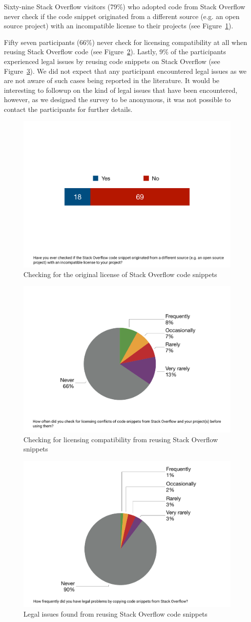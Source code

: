 \documentclass{svjour3}                     %
\begin{document}
Sixty-nine Stack Overflow visitors (79\%) who adopted code from Stack Overflow
never check if the code snippet originated from a different source (e.g. an open
source project) with an incompatible license to their projects (see
Figure~\ref{fig:survey_visitor_original_license}).

Fifty seven participants (66\%) never check for licensing compatibility at all
when reusing Stack Overflow code (see
Figure~\ref{fig:survey_visitor_licensing_conflict_check}). Lastly, 9\% of
the participants experienced legal issues by reusing code snippets on Stack
Overflow (see Figure~\ref{fig:survey_visitor_legal_issue}). We did not
expect that any participant encountered legal issues as we are not
aware of such cases being reported in the literature. It would
be interesting to followup on the kind of legal issues that have been
encountered, however, as we designed the
survey to be anonymous, it was not possible to contact the participants for further details.

\begin{figure} \centering
	\includegraphics[width=.4\linewidth]{survey_visitor_original_license} 
	\caption{Checking for the original license of Stack Overflow code snippets}
	\label{fig:survey_visitor_original_license} 
\end{figure}

\begin{figure} \centering
	\includegraphics[width=.4\linewidth]{survey_visitor_licensing_conflict_check} 
	\caption{Checking for licensing compatibility from reusing Stack Overflow snippets}
	\label{fig:survey_visitor_licensing_conflict_check} 
\end{figure}

\begin{figure} \centering
	\includegraphics[width=.4\linewidth]{survey_visitor_legal_issue} 
	\caption{Legal issues found from reusing Stack Overflow code snippets}
	\label{fig:survey_visitor_legal_issue} 
\end{figure}
\end{document}
